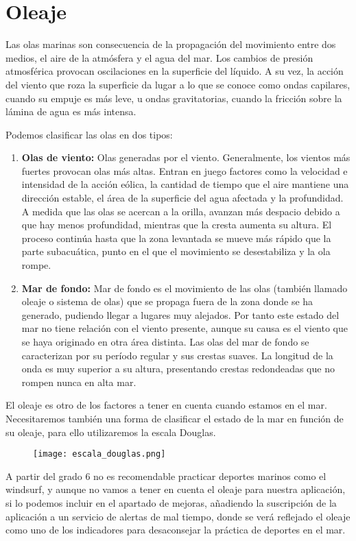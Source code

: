 \section{Oleaje}


Las olas marinas son consecuencia de la propagación del movimiento entre dos medios, el aire de la
atmósfera y el agua del mar. Los cambios de presión atmosférica provocan oscilaciones en la
superficie del líquido. A su vez, la acción del viento que roza la superficie da lugar a lo que se
conoce como ondas capilares, cuando su empuje es más leve, u ondas gravitatorias, cuando la
fricción sobre la lámina de agua es más intensa.

Podemos clasificar las olas en dos tipos:

\begin{enumerate}
\item \textbf{Olas de viento: }
Olas generadas por el viento. Generalmente, los vientos más fuertes provocan olas más altas. Entran en juego factores como la
velocidad e intensidad de la acción eólica, la cantidad de tiempo que el aire mantiene una dirección
estable, el área de la superficie del agua afectada y la profundidad. A medida que las olas se
acercan a la orilla, avanzan más despacio debido a que hay menos profundidad, mientras que la
cresta aumenta su altura. El proceso continúa hasta que la zona levantada se mueve más rápido
que la parte subacuática, punto en el que el movimiento se desestabiliza y la ola rompe.

 \item \textbf{Mar de fondo: } 
Mar de fondo es el movimiento de las olas (también llamado oleaje o
sistema de olas) que se propaga fuera de la zona donde se ha generado, pudiendo llegar a lugares
muy alejados. Por tanto este estado del mar no tiene relación con el viento presente, aunque su 
causa es el viento que se haya originado en otra área distinta. Las olas del mar de fondo se
caracterizan por su período regular y sus crestas suaves. La longitud de la onda es muy superior a su
altura, presentando crestas redondeadas que no rompen nunca en alta mar.

\end{enumerate}


El oleaje es otro de los factores a tener en cuenta cuando estamos en el mar. Necesitaremos también una forma de clasificar el estado de la mar en función de su oleaje, para ello utilizaremos la escala Douglas. \cite{DOUGLAS}


\begin{figure}[hb]
\texttt{[image: escala\_douglas.png]} 
\end{figure}

A partir del grado 6 no es recomendable practicar deportes marinos como el windsurf, y aunque no vamos a tener en cuenta el oleaje para nuestra aplicación, si lo podemos incluir en el apartado de mejoras, añadiendo la suscripción de la aplicación a un servicio de alertas de mal tiempo, donde se verá reflejado el oleaje como uno de los indicadores para desaconsejar la práctica de deportes en el mar. 

